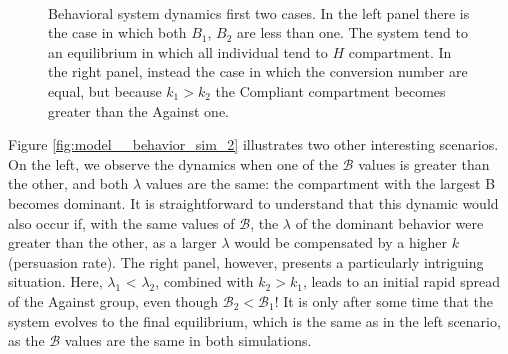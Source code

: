 \begin{figure}[ht]
	\centering
	 \quad
	 \\
	\caption[Behavioural model simulation first]{Behavioral system dynamics first two cases. In the left panel there is the case in which both $B_1$, $B_2$ are less than one. The system tend to an equilibrium in which all individual tend to $H$ compartment. In the right panel, instead the case in which the conversion number are equal, but because $k_1 > k_2$ the Compliant compartment becomes greater than the Against one.}
	\label{fig:model__behavior_sim_1}
\end{figure}
\label{subsec:model_behav}

Figure \ref{fig:model__behavior_sim_2} illustrates two other interesting scenarios. On the left, we observe the dynamics when one of the $\mathcal{B}$ values is greater than the other, and both $\lambda$ values are the same: the compartment with the largest B becomes dominant. It is straightforward to understand that this dynamic would also occur if, with the same values of $\mathcal{B}$, the $\lambda$ of the dominant behavior were greater than the other, as a larger $\lambda$ would be compensated by  a higher $k$ (persuasion rate). The right panel, however, presents a particularly intriguing situation. Here, $\lambda_1$ < $\lambda_2$, combined with $k_2 > k_1$, leads to an initial rapid spread of the Against group, even though $\mathcal{B}_2 < \mathcal{B}_1$! It is only after some time that the system evolves to the final equilibrium, which is the same as in the left scenario, as the $\mathcal{B}$ values are the same in both simulations.

